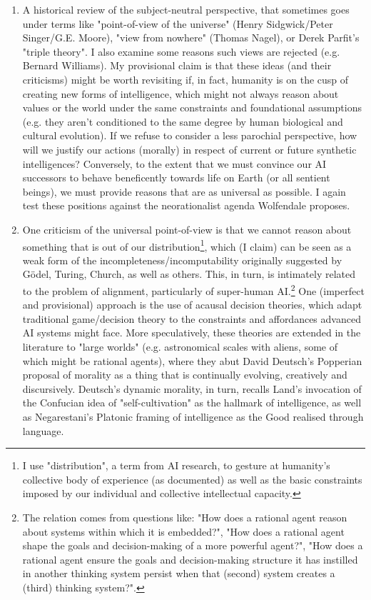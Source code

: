 \begin{abstractspacing}
\begin{enumerate}
\item A historical review of the subject-neutral perspective, that sometimes goes under terms like "point-of-view of the universe" (Henry Sidgwick/Peter Singer/G.E. Moore), "view from nowhere" (Thomas Nagel), or Derek Parfit's "triple theory". I also examine some reasons such views are rejected (e.g. Bernard Williams). My provisional claim is that these ideas (and their criticisms) might be worth revisiting if, in fact, humanity is on the cusp of creating new forms of intelligence, which might not always reason about values or the world under the same constraints and foundational assumptions (e.g. they aren't conditioned to the same degree by human biological and cultural evolution). If we refuse to consider a less parochial perspective, how will we justify our actions (morally) in respect of current or future synthetic intelligences? Conversely, to the extent that we must convince our AI successors to behave beneficently towards life on Earth (or all sentient beings), we must provide reasons that are as universal as possible. I again test these positions against the neorationalist agenda Wolfendale proposes.

\item One criticism of the universal point-of-view is that we cannot reason about something that is out of our distribution\footnote{I use "distribution", a term from AI research, to gesture at humanity's collective body of experience (as documented) as well as the basic constraints imposed by our individual and collective intellectual capacity.}, which (I claim) can be seen as a weak form of the incompleteness/incomputability originally suggested by Gödel, Turing, Church, as well as others. This, in turn, is intimately related to the problem of alignment, particularly of super-human AI.\footnote{The relation comes from questions like: "How does a rational agent reason about systems within which it is embedded?", "How does a rational agent shape the goals and decision-making of a more powerful agent?", "How does a rational agent ensure the goals and decision-making structure it has instilled in another thinking system persist when that (second) system creates a (third) thinking system?".} One (imperfect and provisional) approach is the use of acausal decision theories, which adapt traditional game/decision theory to the constraints and affordances advanced AI systems might face. More speculatively, these theories are extended in the literature to "large worlds" (e.g. astronomical scales with aliens, some of which might be rational agents), where they abut David Deutsch's Popperian proposal of morality as a thing that is continually evolving, creatively and discursively. Deutsch's dynamic morality, in turn, recalls Land's invocation of the Confucian idea of "self-cultivation" as the hallmark of intelligence, as well as Negarestani's Platonic framing of intelligence as the Good realised through language.


\end{enumerate}
\end{abstractspacing}
